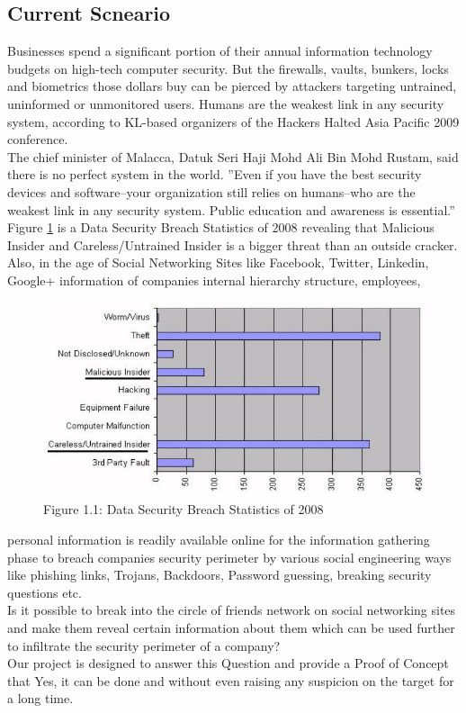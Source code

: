 \subsection{Current Scneario}
Businesses spend a significant portion of their annual information technology budgets on high-tech computer security. But the firewalls, vaults, bunkers, locks and biometrics those dollars buy can be pierced by attackers targeting untrained, uninformed or unmonitored users. Humans are the weakest link in any security system, according to KL-based organizers of the Hackers Halted Asia Pacific 2009 conference.\cite{link_humanweak}\\[0.5cm]
The chief minister of Malacca, Datuk Seri Haji Mohd Ali Bin Mohd Rustam, said there is no perfect system in the world. ”Even if you have the best security devices and software–your organization still relies on humans–who are the weakest link in any security system. Public education and awareness is essential.”\\[0.5cm]
Figure \ref{fig:data} is a Data Security Breach Statistics of 2008 revealing that Malicious Insider and Careless/Untrained Insider is a bigger threat than an outside cracker.\\[0.5cm]
Also, in the age of Social Networking Sites like Facebook, Twitter, Linkedin, Google+ information of companies internal hierarchy structure, employees,
\begin{figure}[htb]
\centering
\includegraphics[scale=0.6]{project/diagrams/figdata}
\caption{Figure 1.1: Data Security Breach Statistics of 2008}
\label{fig:data} %
\end{figure}
personal information is readily available online for the information gathering phase to breach companies security perimeter by various social engineering ways like phishing links, Trojans, Backdoors, Password guessing, breaking security questions etc.\\[0.5cm]
Is it possible to break into the circle of friends network on social networking sites and make them reveal certain information about them which can be used further to infiltrate the security perimeter of a company?\\[0.5cm]
Our project is designed to answer this Question and provide a Proof of Concept that Yes, it can be done and without even raising any suspicion on the target for a long time.


